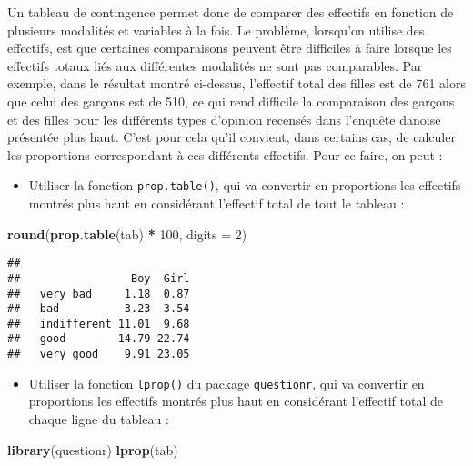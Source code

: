 \documentclass[
  french,
]{book}
\newenvironment{Shaded}{\begin{snugshade}}{\end{snugshade}}
\newcommand{\DataTypeTok}[1]{\textcolor[rgb]{0.13,0.29,0.53}{#1}}
\newcommand{\DecValTok}[1]{\textcolor[rgb]{0.00,0.00,0.81}{#1}}
\newcommand{\KeywordTok}[1]{\textcolor[rgb]{0.13,0.29,0.53}{\textbf{#1}}}
\newcommand{\NormalTok}[1]{#1}
\newcommand{\OperatorTok}[1]{\textcolor[rgb]{0.81,0.36,0.00}{\textbf{#1}}}
\newcommand{\StringTok}[1]{\textcolor[rgb]{0.31,0.60,0.02}{#1}}
\providecommand{\tightlist}{%
  \setlength{\itemsep}{0pt}\setlength{\parskip}{0pt}}
\begin{document}
Un tableau de contingence permet donc de comparer des effectifs en fonction de plusieurs modalités et variables à la fois. Le problème, lorsqu'on utilise des effectifs, est que certaines comparaisons peuvent être difficiles à faire lorsque les effectifs totaux liés aux différentes modalités ne sont pas comparables. Par exemple, dans le résultat montré ci-dessus, l'effectif total des filles est de 761 alors que celui des garçons est de 510, ce qui rend difficile la comparaison des garçons et des filles pour les différents types d'opinion recensés dans l'enquête danoise présentée plus haut. C'est pour cela qu'il convient, dans certains cas, de calculer les proportions correspondant à ces différents effectifs. Pour ce faire, on peut :

\begin{itemize}
\tightlist
\item
  Utiliser la fonction \texttt{prop.table()}, qui va convertir en proportions les effectifs montrés plus haut en considérant l'effectif total de tout le tableau :
\end{itemize}

\begin{Shaded}
\begin{Highlighting}[]
\KeywordTok{round}\NormalTok{(}\KeywordTok{prop.table}\NormalTok{(tab) }\OperatorTok{*}\StringTok{ }\DecValTok{100}\NormalTok{, }\DataTypeTok{digits =} \DecValTok{2}\NormalTok{)}
\end{Highlighting}
\end{Shaded}

\begin{verbatim}
##              
##                 Boy  Girl
##   very bad     1.18  0.87
##   bad          3.23  3.54
##   indifferent 11.01  9.68
##   good        14.79 22.74
##   very good    9.91 23.05
\end{verbatim}

\begin{itemize}
\tightlist
\item
  Utiliser la fonction \texttt{lprop()} du package \texttt{questionr}, qui va convertir en proportions les effectifs montrés plus haut en considérant l'effectif total de chaque ligne du tableau :
\end{itemize}

\begin{Shaded}
\begin{Highlighting}[]
\KeywordTok{library}\NormalTok{(questionr)}
\KeywordTok{lprop}\NormalTok{(tab)}
\end{Highlighting}
\end{Shaded}
\end{document}
